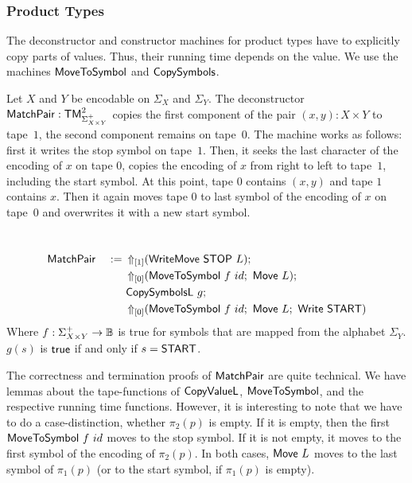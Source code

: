 \subsubsection{Product Types}
\label{sec:MatchPair}

The deconstructor and constructor machines for product types have to explicitly copy parts of values.  Thus, their running time depends on the value.  We
use the machines $\MS{MoveToSymbol}$ and $\MS{CopySymbols}$.

Let $X$ and $Y$ be encodable on $\Sigma_X$ and $\Sigma_Y$.  The deconstructor $\MS{MatchPair} : \TM_{\Sigma_{X \times Y}^+}^2$ copies the first
component of the pair $(x,y):X \times Y$ to tape~$1$, the second component remains on tape~$0$.  The machine works as follows: first it writes the
stop symbol on tape~$1$.  Then, it seeks the last character of the encoding of $x$ on tape $0$, copies the encoding of $x$ from right to left to
tape~$1$, including the start symbol.  At this point, tape $0$ contains $(x,y)$ and tape $1$ contains $x$.  Then it again moves tape $0$ to last
symbol of the encoding of $x$ on tape~$0$ and overwrites it with a new start symbol.

%
\begin{definition}[$\MS{MatchPair}$][MatchPair]
  \label{def:MatchPair}
  ~
  \begin{alignat*}{2}
    &\MS{MatchPair}&~:=~& \LiftTapes{(\MS{WriteMove}~\MS{STOP}~L)}{\Vector{1}} \Seq \\
    &              &    & \LiftTapes{(\MS{MoveToSymbol}~f~id \Seq \MS{Move}~L)}{\Vector{0}} \Seq \\
    &              &    & \MS{CopySymbolsL}~g\Seq \\
    &              &    & \LiftTapes{(\MS{MoveToSymbol}~f~id \Seq \MS{Move}~L \Seq \MS{Write}~\MS{START})}{\Vector{0}}
  \end{alignat*}
  Where $f : \Sigma_{X \times Y}^+ \to \Bool$ is true for symbols that are mapped from the alphabet $\Sigma_Y$.  $g(s)$ is $\true$ if and only if
  $s=\MS{START}$.
\end{definition}

The correctness and termination proofs of $\MS{MatchPair}$ are quite technical.  We have lemmas about the tape-functions of $\MS{CopyValueL}$,
$\MS{MoveToSymbol}$, and the respective running time functions.  However, it is interesting to note that we have to do a case-distinction, whether
$\pi_2(p)$ is empty.  If it is empty, then the first $\MS{MoveToSymbol}~f~id$ moves to the stop symbol.  If it is not empty, it moves to the first
symbol of the encoding of $\pi_2(p)$.  In both cases, $\MS{Move}~L$ moves to the last symbol of $\pi_1(p)$ (or to the start symbol, if $\pi_1(p)$ is
empty).

